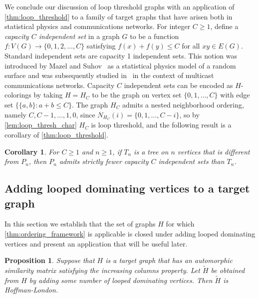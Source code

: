 \documentclass[11pt]{article}
\newtheorem{corollary}[theorem]{Corollary}
\newtheorem{proposition}[theorem]{Proposition}
\theoremstyle{definition}
\begin{document}
We conclude our discussion of loop threshold graphs with an application of \cref{thm:loop_threshold} to a family of target graphs that have arisen both in statistical physics and communications networks. For integer $C \ge 1$, define a \emph{capacity $C$ independent set} in a graph $G$ to be a function $f:V(G) \to \{0,1,2,\ldots, C\}$ satisfying $f(x)+f(y)\le C$ for all $xy \in E(G)$. Standard independent sets are capacity 1 independent sets. This notion was introduced by Mazel and Suhov~\cite{MazelSuhov1991} as a statistical physics model of a random surface and was subsequently studied in~\cite{GalvinMartinelliRamananTetali2011,RamananSenguptaZiedinsMitra2002} in the context of multicast communications networks. Capacity $C$ independent sets can be encoded as $H$-colorings by taking $H=H_C$ to be the graph on vertex set $\{0,1,\ldots, C\}$ with edge set $\{\{a,b\}: a+b \le C\}$. The graph $H_C$ admits a nested neighborhood ordering, namely $C, C-1, \ldots, 1, 0$, since $N_{H_C}(i)=\{0,1,\ldots, C-i\}$, so by \cref{lem:loop_thresh_char} $H_C$ is loop threshold, and the following result is a corollary of \cref{thm:loop_threshold}.

\begin{corollary}
For $C \ge 1$ and $n \ge 1$, if $T_n$ is a tree on $n$ vertices that is different from $P_n$, then $P_n$ admits strictly fewer capacity $C$ independent sets than $T_n$.   
\end{corollary}

\subsection{Adding looped dominating vertices to a target graph}

In this section we establish that the set of graphs $H$ for which \cref{thm:ordering_framework} is applicable is closed under adding looped dominating vertices and present an application that will be useful later.

\begin{proposition} \label{prop:closure}
Suppose that $H$ is a target graph that has an automorphic similarity matrix satisfying the increasing columns property. Let $\widetilde{H}$ be obtained from $H$ by adding some number of looped dominating vertices. Then $\widetilde{H}$ is Hoffman-London.
\end{proposition}
\end{document}
